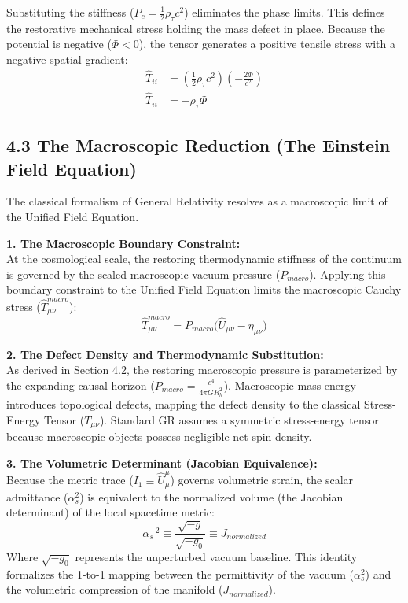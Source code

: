 Substituting the stiffness ($P_c = \frac{1}{2}\rho_\tau c^2$) eliminates the phase limits. This defines the restorative mechanical stress holding the mass defect in place. Because the potential is negative ($\Phi < 0$), the tensor generates a positive tensile stress with a negative spatial gradient: 
\begin{align}
    \hat{T}_{ii} &= \left( \frac{1}{2}\rho_\tau c^2 \right) \left( - \frac{2\Phi}{c^2} \right) \nonumber \\ 
    \hat{T}_{ii} &= - \rho_\tau \Phi \label{eq:spatial_stress_potential} 
\end{align}


\vspace{0.2 cm}



\subsection*{4.3 The Macroscopic Reduction (The Einstein Field Equation)}
\label{sec:deriv_einstein_reduction}
The classical formalism of General Relativity resolves as a macroscopic limit of the Unified Field Equation.

\textbf{1. The Macroscopic Boundary Constraint:} \\
At the cosmological scale, the restoring thermodynamic stiffness of the continuum is governed by the scaled macroscopic vacuum pressure ($P_{macro}$). Applying this boundary constraint to the Unified Field Equation limits the macroscopic Cauchy stress ($\hat{T}^{macro}_{\mu\nu}$):
\begin{equation}
    \hat{T}^{macro}_{\mu\nu} = P_{macro} \Big( \hat{U}_{\mu\nu} - \eta_{\mu\nu} \Big) \label{eq:field_equation_macro}
\end{equation}

\textbf{2. The Defect Density and Thermodynamic Substitution:} \\
As derived in Section 4.2, the restoring macroscopic pressure is parameterized by the expanding causal horizon ($P_{macro} = \frac{c^4}{4\pi G R_h^2}$). Macroscopic mass-energy introduces topological defects, mapping the defect density to the classical Stress-Energy Tensor ($T_{\mu\nu}$). Standard GR assumes a symmetric stress-energy tensor because macroscopic objects possess negligible net spin density.

\vspace{0.2 cm}
\textbf{3. The Volumetric Determinant (Jacobian Equivalence):} \\
Because the metric trace ($I_1 \equiv \hat{U}^\mu_\mu$) governs volumetric strain, the scalar admittance ($\alpha_s^2$) is equivalent to the normalized volume (the Jacobian determinant) of the local spacetime metric:
\begin{equation}
    \alpha_s^{-2} \equiv \frac{\sqrt{-g}}{\sqrt{-g_0}} \equiv J_{normalized}
\end{equation}
Where $\sqrt{-g_0}$ represents the unperturbed vacuum baseline. This identity formalizes the 1-to-1 mapping between the permittivity of the vacuum ($\alpha_s^2$) and the volumetric compression of the manifold ($J_{normalized}$).




